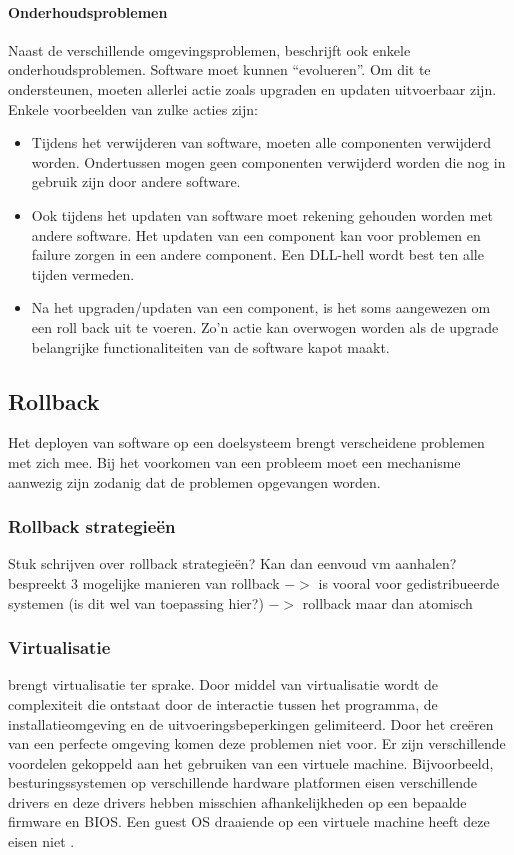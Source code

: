 \paragraph{Onderhoudsproblemen}
Naast de verschillende omgevingsproblemen, beschrijft \citet{dolstra2006purely} ook enkele onderhoudsproblemen.
Software moet kunnen ``evolueren''.
Om dit te ondersteunen, moeten allerlei actie zoals upgraden en updaten uitvoerbaar zijn.
Enkele voorbeelden van zulke acties zijn:
\begin{itemize}
\item Tijdens het verwijderen van software, moeten alle componenten verwijderd worden.
Ondertussen mogen geen componenten verwijderd worden die nog in gebruik zijn door andere software.
\item Ook tijdens het updaten van software moet rekening gehouden worden met andere software.
Het updaten van een component kan voor problemen en failure zorgen in een andere component.
Een DLL-hell wordt best ten alle tijden vermeden.
\item Na het upgraden/updaten van een component, is het soms aangewezen om een roll back uit te voeren.
Zo'n actie kan overwogen worden als de upgrade belangrijke functionaliteiten van de software kapot maakt.
\end{itemize}

\subsection{Rollback}
Het deployen van software op een doelsysteem brengt verscheidene problemen met zich mee.
Bij het voorkomen van een probleem moet een mechanisme aanwezig zijn zodanig dat de problemen opgevangen worden.

\subsubsection{Rollback strategieën}
Stuk schrijven over rollback strategieën? Kan dan eenvoud vm aanhalen?
\citet{srinivasan2004flashback} bespreekt 3 mogelijke manieren van rollback
\citet{elnozahy2002survey} $->$ is vooral voor gedistribueerde systemen (is dit wel van toepassing hier?)
\citet{machado2008enabling} $->$ rollback maar dan atomisch


\subsubsection{Virtualisatie}\label{sec:virtualisatie}
\citet{softwareDeployment} brengt virtualisatie ter sprake.
Door middel van virtualisatie wordt de complexiteit die ontstaat door de interactie tussen het programma, de installatieomgeving en de uitvoeringsbeperkingen gelimiteerd.
Door het creëren van een perfecte omgeving komen deze problemen niet voor.
Er zijn verschillende voordelen gekoppeld aan het gebruiken van een virtuele machine.
Bijvoorbeeld, besturingssystemen op verschillende hardware platformen eisen verschillende drivers en deze drivers hebben misschien afhankelijkheden op een bepaalde firmware en BIOS.
Een guest OS draaiende op een virtuele machine heeft deze eisen niet \citep{shumate2004implications}.


